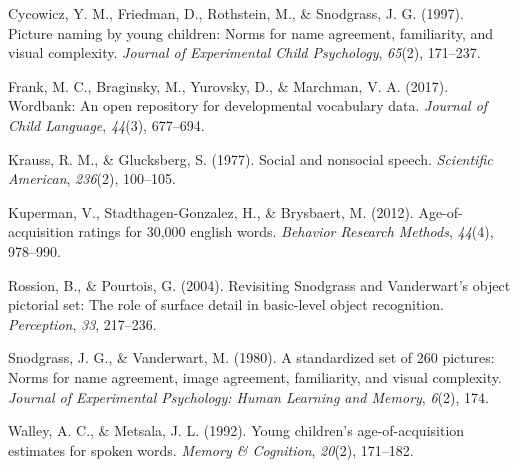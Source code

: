 \documentclass[10pt, letterpaper]{article}
\begin{document}
\leavevmode\hypertarget{ref-cycowicz1997}{}%
Cycowicz, Y. M., Friedman, D., Rothstein, M., \& Snodgrass, J. G.
(1997). Picture naming by young children: Norms for name agreement,
familiarity, and visual complexity. \emph{Journal of Experimental Child
Psychology}, \emph{65}(2), 171--237.

\leavevmode\hypertarget{ref-frank2017}{}%
Frank, M. C., Braginsky, M., Yurovsky, D., \& Marchman, V. A. (2017).
Wordbank: An open repository for developmental vocabulary data.
\emph{Journal of Child Language}, \emph{44}(3), 677--694.

\leavevmode\hypertarget{ref-krauss1977}{}%
Krauss, R. M., \& Glucksberg, S. (1977). Social and nonsocial speech.
\emph{Scientific American}, \emph{236}(2), 100--105.

\leavevmode\hypertarget{ref-kuperman2012}{}%
Kuperman, V., Stadthagen-Gonzalez, H., \& Brysbaert, M. (2012).
Age-of-acquisition ratings for 30,000 english words. \emph{Behavior
Research Methods}, \emph{44}(4), 978--990.

\leavevmode\hypertarget{ref-rossion2004}{}%
Rossion, B., \& Pourtois, G. (2004). Revisiting Snodgrass and
Vanderwart's object pictorial set: The role of surface detail in
basic-level object recognition. \emph{Perception}, \emph{33}, 217--236.

\leavevmode\hypertarget{ref-snodgrass1980}{}%
Snodgrass, J. G., \& Vanderwart, M. (1980). A standardized set of 260
pictures: Norms for name agreement, image agreement, familiarity, and
visual complexity. \emph{Journal of Experimental Psychology: Human
Learning and Memory}, \emph{6}(2), 174.

\leavevmode\hypertarget{ref-walley1992}{}%
Walley, A. C., \& Metsala, J. L. (1992). Young children's
age-of-acquisition estimates for spoken words. \emph{Memory \&
Cognition}, \emph{20}(2), 171--182.


\end{document}
